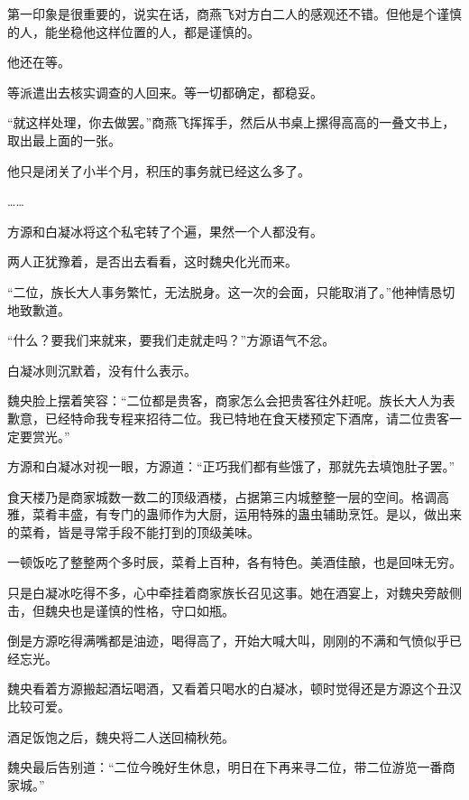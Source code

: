 \begin{this_body}
第一印象是很重要的，说实在话，商燕飞对方白二人的感观还不错。但他是个谨慎的人，能坐稳他这样位置的人，都是谨慎的。

他还在等。

等派遣出去核实调查的人回来。等一切都确定，都稳妥。

“就这样处理，你去做罢。”商燕飞挥挥手，然后从书桌上摞得高高的一叠文书上，取出最上面的一张。

他只是闭关了小半个月，积压的事务就已经这么多了。

……

方源和白凝冰将这个私宅转了个遍，果然一个人都没有。

两人正犹豫着，是否出去看看，这时魏央化光而来。

“二位，族长大人事务繁忙，无法脱身。这一次的会面，只能取消了。”他神情恳切地致歉道。

“什么？要我们来就来，要我们走就走吗？”方源语气不忿。

白凝冰则沉默着，没有什么表示。

魏央脸上摆着笑容：“二位都是贵客，商家怎么会把贵客往外赶呢。族长大人为表歉意，已经特命我专程来招待二位。我已特地在食天楼预定下酒席，请二位贵客一定要赏光。”

方源和白凝冰对视一眼，方源道：“正巧我们都有些饿了，那就先去填饱肚子罢。”

食天楼乃是商家城数一数二的顶级酒楼，占据第三内城整整一层的空间。格调高雅，菜肴丰盛，有专门的蛊师作为大厨，运用特殊的蛊虫辅助烹饪。是以，做出来的菜肴，皆是寻常手段不能打到的顶级美味。

一顿饭吃了整整两个多时辰，菜肴上百种，各有特色。美酒佳酿，也是回味无穷。

只是白凝冰吃得不多，心中牵挂着商家族长召见这事。她在酒宴上，对魏央旁敲侧击，但魏央也是谨慎的性格，守口如瓶。

倒是方源吃得满嘴都是油迹，喝得高了，开始大喊大叫，刚刚的不满和气愤似乎已经忘光。

魏央看着方源搬起酒坛喝酒，又看着只喝水的白凝冰，顿时觉得还是方源这个丑汉比较可爱。

酒足饭饱之后，魏央将二人送回楠秋苑。

魏央最后告别道：“二位今晚好生休息，明日在下再来寻二位，带二位游览一番商家城。”

\end{this_body}

